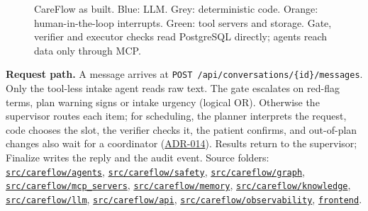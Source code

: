 \documentclass[10pt,a4paper]{article}
\newcommand{\repourl}{https://github.com/saideepaksana/careflow}
\newcommand{\rev}{cs5903-final-2026}
\newcommand{\dir}[1]{\href{\repourl/tree/\rev/#1}{\nolinkurl{#1}}}
\newcommand{\adr}[1]{\href{\repourl/blob/\rev/docs/Architecture_Decision_Records.md}{ADR-#1}}
\newcommand{\cmd}[1]{\nolinkurl{#1}}
\begin{document}
\begin{figure}[h]
\caption{CareFlow as built. Blue: LLM. Grey: deterministic code. Orange: human-in-the-loop interrupts. Green: tool servers and storage. Gate, verifier and executor checks read PostgreSQL directly; agents reach data only through MCP.}
\label{fig:arch}
\end{figure}

\textbf{Request path.} A message arrives at \cmd{POST /api/conversations/{id}/messages}. Only the tool-less intake agent reads raw text. The gate escalates on red-flag terms, plan warning signs or intake urgency (logical OR). Otherwise the supervisor routes each item; for scheduling, the planner interprets the request, code chooses the slot, the verifier checks it, the patient confirms, and out-of-plan changes also wait for a coordinator (\adr{014}). Results return to the supervisor; Finalize writes the reply and the audit event. Source folders: \dir{src/careflow/agents}, \dir{src/careflow/safety}, \dir{src/careflow/graph}, \dir{src/careflow/mcp_servers}, \dir{src/careflow/memory}, \dir{src/careflow/knowledge}, \dir{src/careflow/llm}, \dir{src/careflow/api}, \dir{src/careflow/observability}, \dir{frontend}.
\end{document}
